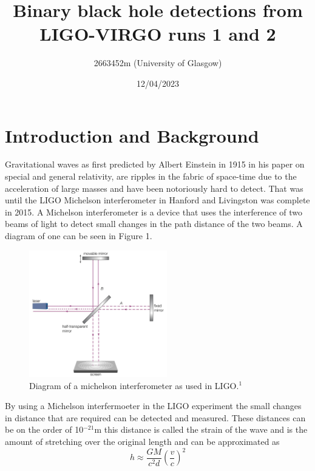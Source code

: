 \documentclass[]{article}
\title{\textbf{Binary black hole detections from LIGO-VIRGO runs 1 and 2}}
\author{2663452m (University of Glasgow)}
\date{12/04/2023}
\begin{document}
\maketitle

\begin{abstract}

\end{abstract}
\twocolumn
\newpage





\section*{Introduction and Background}
Gravitational waves as first predicted by Albert Einstein in 1915 in his paper on
special and general relativity, are ripples in the fabric of space-time due to the acceleration of large masses
and have been notoriously hard to detect. That was until
the LIGO Michelson interferometer in Hanford and Livingston was complete in 2015.
A Michelson interferometer is a device that uses the interference of two beams of
light to detect small changes in the path distance of the two beams. A diagram of one can
be seen in Figure 1.
\begin{figure}[h]
    \includegraphics[width=6cm]{images/michelson_interferometer.png}
    \caption{Diagram of a michelson interferometer as used in LIGO.$^1$}
    \label{fig:michelson}
\end{figure}
\newline
By using a Michelson interfermoeter in the LIGO experiment the small changes in
distance that are required can be detected and measured. These distances can be on the
order of 10$^{-21}$m this distance is called the strain of the wave and
is the amount of stretching over the original length and can be approximated as
\begin{equation}h \approx \frac{GM}{c^2d}\left(\frac{v}{c}\right)^2 \label{eq:strain}\end{equation}
\end{document}
